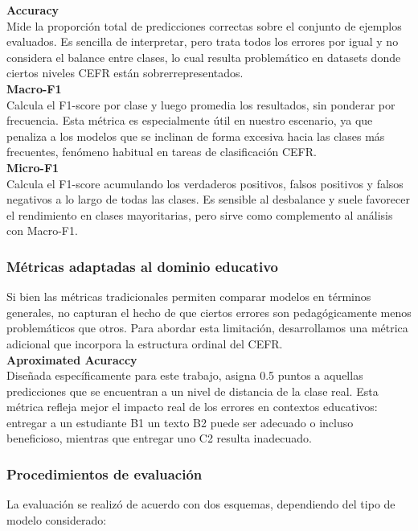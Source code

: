 \noindent\textbf{Accuracy}\\
Mide la proporción total de predicciones correctas sobre el conjunto de ejemplos evaluados. Es sencilla de interpretar, pero trata todos los errores por igual y no considera el balance entre clases, lo cual resulta problemático en datasets donde ciertos niveles CEFR están sobrerrepresentados.\\

\noindent\textbf{Macro-F1}\\
Calcula el F1-score por clase y luego promedia los resultados, sin ponderar por frecuencia. Esta métrica es especialmente útil en nuestro escenario, ya que penaliza a los modelos que se inclinan de forma excesiva hacia las clases más frecuentes, fenómeno habitual en tareas de clasificación CEFR.\\

\noindent\textbf{Micro-F1}\\
Calcula el F1-score acumulando los verdaderos positivos, falsos positivos y falsos negativos a lo largo de todas las clases. Es sensible al desbalance y suele favorecer el rendimiento en clases mayoritarias, pero sirve como complemento al análisis con Macro-F1.

\subsubsection{Métricas adaptadas al dominio educativo}

Si bien las métricas tradicionales permiten comparar modelos en términos generales, no capturan el hecho de que ciertos errores son pedagógicamente menos problemáticos que otros. Para abordar esta limitación, desarrollamos una métrica adicional que incorpora la estructura ordinal del CEFR.\\

\noindent\textbf{Aproximated Acuraccy}\\
Diseñada específicamente para este trabajo, asigna 0.5 puntos a aquellas predicciones que se encuentran a un nivel de distancia de la clase real. Esta métrica refleja mejor el impacto real de los errores en contextos educativos: entregar a un estudiante B1 un texto B2 puede ser adecuado o incluso beneficioso, mientras que entregar uno C2 resulta inadecuado.

\subsubsection{Procedimientos de evaluación}
La evaluación se realizó de acuerdo con dos esquemas, dependiendo del tipo de modelo considerado:\\


